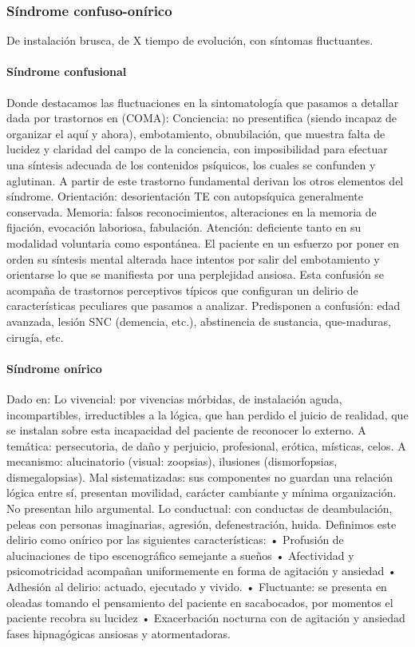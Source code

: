 \subsubsection*{Síndrome confuso-onírico}
De instalación brusca, de X tiempo de evolución, con síntomas fluctuantes.
\paragraph{Síndrome confusional}
Donde destacamos las fluctuaciones en la sintomatología que pasamos a detallar dada por trastornos en (COMA): Conciencia: no presentifica (siendo incapaz de organizar el aquí y ahora), embotamiento, obnubilación, que muestra falta de lucidez y claridad del campo de la conciencia, con imposibilidad para efectuar una síntesis adecuada de los contenidos psíquicos, los cuales se confunden y aglutinan. A partir de este trastorno fundamental derivan los otros elementos del síndrome. Orientación: desorientación TE con autopsíquica generalmente conservada. Memoria: falsos reconocimientos, alteraciones en la memoria de fijación, evocación laboriosa, fabulación. Atención: deficiente tanto en su modalidad voluntaria como espontánea. El paciente en un esfuerzo por poner en orden su síntesis mental alterada hace intentos por salir del embotamiento y orientarse lo que se manifiesta por una perplejidad ansiosa. Esta confusión se acompaña de trastornos perceptivos típicos que configuran un delirio de características peculiares que pasamos a analizar. Predisponen a confusión: edad avanzada, lesión SNC (demencia, etc.), abstinencia de sustancia, que-maduras, cirugía, etc.
\paragraph{Síndrome onírico}
Dado en: Lo vivencial: por vivencias mórbidas, de instalación aguda, incompartibles, irreductibles a la lógica, que han perdido el juicio de realidad, que se instalan sobre esta incapacidad del paciente de reconocer lo externo. A temática: persecutoria, de daño y perjuicio, profesional, erótica, místicas, celos. A mecanismo: alucinatorio (visual: zoopsias), ilusiones (dismorfopsias, dismegalopsias). Mal sistematizadas: sus componentes no guardan una relación lógica entre sí, presentan movilidad, carácter cambiante y mínima organización. No presentan hilo argumental. Lo conductual: con conductas de deambulación, peleas con personas imaginarias, agresión, defenestración, huida. Definimos este delirio como onírico por las siguientes características: • Profusión de alucinaciones de tipo escenográfico semejante a sueños • Afectividad y psicomotricidad acompañan uniformemente en forma de agitación y ansiedad • Adhesión al delirio: actuado, ejecutado y vivido. • Fluctuante: se presenta en oleadas tomando el pensamiento del paciente en sacabocados, por momentos el paciente recobra su lucidez • Exacerbación nocturna con de agitación y ansiedad fases hipnagógicas ansiosas y atormentadoras.

